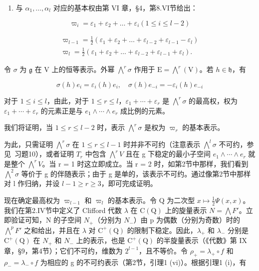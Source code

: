 \begin{enumerate}
\def\labelenumi{(\Roman{enumi})}
\setcounter{enumi}{3}
\tightlist
\item
与 \(\alpha_{1},\ldots,\alpha_{l}\) 对应的基本权由第 VI 章，§4，第8.VI节给出：
\end{enumerate}

\[
\varpi_ {i} = \varepsilon_ {1} + \varepsilon_ {2} + \dots + \varepsilon_ {i} (1 \leq i \leq l - 2)
\]

\[
\begin{array}{c} \varpi_ {l - 1} = \frac {1}{2} (\varepsilon_ {1} + \varepsilon_ {2} + \ldots + \varepsilon_ {l - 2} + \varepsilon_ {l - 1} - \varepsilon_ {l}) \\ \varpi_ {l} = \frac {1}{2} (\varepsilon_ {1} + \varepsilon_ {2} + \ldots + \varepsilon_ {l - 2} + \varepsilon_ {l - 1} + \varepsilon_ {l}). \end{array}
\]

令 \(\sigma\) 为 \(\mathfrak{g}\) 在 V 上的恒等表示。外幂 \(\bigwedge^{r}\sigma\) 作用于 \(\mathrm{E} = \bigwedge^{r}(\mathrm{V})\)。若 \(h\in \mathfrak{h}\)，有

\[
\sigma (h) e _ {i} = \varepsilon_ {i} (h) e _ {i}, \quad \sigma (h) e _ {- i} = - \varepsilon_ {i} (h) e _ {- i}
\]

对于 \(1 \leq i \leq l\)，由此，对于 \(1 \leq r \leq l\)，\(\varepsilon_{1} + \cdots + \varepsilon_{r}\) 是 \(\bigwedge^{r} \sigma\) 的最高权，权为 \(\varepsilon_{1} + \cdots + \varepsilon_{r}\) 的元素正是与 \(e_{1} \wedge \cdots \wedge e_{r}\) 成比例的元素。

我们将证明，当 \(1 \leq r \leq l - 2\) 时，表示 \(\bigwedge^{r} \sigma\) 是权为 \(\varpi_{r}\) 的基本表示。

为此，只需证明 \(\bigwedge^{r}\sigma\) 在 \(1 \leq r \leq l - 1\) 时并非不可约（注意表示 \(\bigwedge^{l}\sigma\) 不可约，参见~习题10），或者证明 \(T_{r}\) 中包含 \(\bigwedge^{r}V\) 且在 g 下稳定的最小子空间 \(e_{1} \wedge \cdots \wedge e_{r}\) 就是整个 \(\bigwedge^{r}V\)。当 r = 1 时这立即成立。当 r = 2 时，如第2节中那样，我们看到 \(\bigwedge^{2}\sigma\) 等价于 g 的伴随表示；由于 g 是单的，该表示不可约。通过像第2节中那样对 l 作归纳，并设 \(l - 1 \geq r \geq 3\)，即可完成证明。

现在确定最高权为 \(\varpi_{l-1}\) 和 \(\varpi_{l}\) 的基本表示。令 Q 为二次型 \(x \mapsto \frac{1}{2}\Psi(x, x)\)。我们在第2.IV节中定义了 Clifford 代数 \(\lambda\) 在 \(\mathrm{C}(\mathrm{Q})\) 上的旋量表示 \(N = \bigwedge F'\)。立即验证可知，N 的子空间 \(N_{+}\)（分别为 \(N_{-}\)）由 p 为偶数（分别为奇数）时的 \(\bigwedge^{p}F'\) 之和给出，并且在 \(\lambda\) 对 \(\mathrm{C}^{+}(\mathrm{Q})\) 的限制下稳定。因此，\(\lambda_{+}\) 和 \(\lambda_{-}\) 分别是 \(\mathrm{C}^{+}(\mathrm{Q})\) 在 \(N_{+}\) 和 \(N_{-}\) 上的表示，也是 \(\mathrm{C}^{+}(\mathrm{Q})\) 的半旋量表示（《代数》第 IX 章，§9，第4节）；它们不可约，维数为 \(2^{l-1}\)，且不等价。令 \(\rho_{+} = \lambda_{+} \circ f\) 和 \(\rho_{-} = \lambda_{-} \circ f\) 为相应的 g 的不可约表示（第2节，引理1 (vi)）。根据引理1 (i)，有

